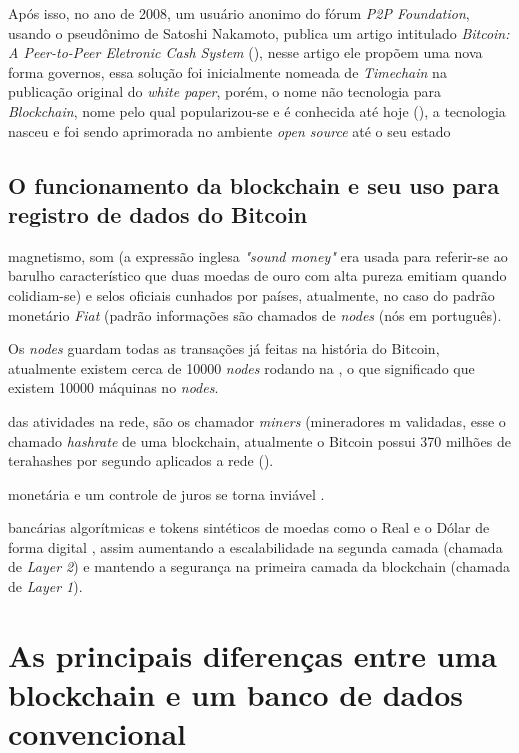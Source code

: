\documentclass[acronym,symbols]{fei}
\begin{document}
Após isso, no ano de 2008, um usuário anonimo do fórum \textit{P2P Foundation}, usando o pseudônimo de Satoshi Nakamoto, publica um artigo intitulado \textit{Bitcoin: A Peer-to-Peer Eletronic Cash System} (\textcite{bitcoinWhitePaper}), nesse artigo ele propõem uma nova forma  governos, essa solução foi inicialmente nomeada de \textit{Timechain} na publicação original do \textit{white paper}, porém, o nome não  tecnologia para \textit{Blockchain}, nome pelo qual popularizou-se e é conhecida até hoje (\textcite{p2pFoundation}), a tecnologia nasceu e foi sendo aprimorada no ambiente \textit{open source} até o seu estado
 
\section{O funcionamento da blockchain e seu uso para registro de dados do Bitcoin}

 magnetismo, som (a expressão inglesa \textit{"sound money"} era usada para referir-se ao barulho característico que duas moedas de ouro com alta pureza emitiam quando colidiam-se) e selos oficiais cunhados por países, atualmente, no caso do padrão monetário \textit{Fiat} (padrão  informações são chamados de \textit{nodes} (nós em português).

Os \textit{nodes} guardam todas as transações já feitas na história do Bitcoin, atualmente existem cerca de 10000 \textit{nodes} rodando na \cite{blockchainInfo}, o que significado que existem 10000 máquinas no \textit{nodes}.

 das atividades na rede, são os chamador \textit{miners} (mineradores m validadas, esse o chamado \textit{hashrate} de uma blockchain, atualmente o Bitcoin possui 370 milhões de terahashes por segundo aplicados a rede (\cite{blockchainInfo}).

 monetária e um controle de juros se torna inviável \cite{bitcoinFernandoUlrich}.

 bancárias algorítmicas e tokens sintéticos de moedas como o Real e o Dólar de forma digital \cite{sinteticos}, assim aumentando a escalabilidade na segunda camada (chamada de \textit{Layer 2}) e mantendo a segurança na primeira camada da blockchain (chamada de \textit{Layer 1}).

\chapter{As principais diferenças entre uma blockchain e um banco de dados convencional}
\end{document}
